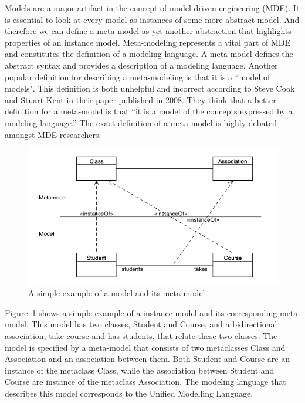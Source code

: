 Models are a major artifact in the concept of model driven engineering (MDE). It
is essential to look at every model as instances of some more abstract model.
And therefore we can define a meta-model as yet another abstraction that
highlights properties of an instance model. Meta-modeling represents a vital
part of MDE and constitutes the definition of a modeling language. A meta-model
defines the abstract syntax and provides a description of a modeling language.
Another popular definition for describing a meta-modeling is that it is a
``model of models". This definition is both unhelpful and incorrect according
to Steve Cook and Stuart Kent in their paper\cite{Cook2008} published in 2008.
They think that a better definition for a meta-model is that ``it is a model of
the concepts expressed by a modeling language.'' The exact definition of a
meta-model is highly debated amongst MDE researchers\cite{Rutle_thesis}. 

\begin{figure}[H]
	\centering
	\includegraphics[scale=0.6]{./Figures/SimpleMetamodel.png}
	\caption[Example of a model and meta-model]
	{A simple example of a model and its meta-model.}
	\label{fig:SimpleMeta-model}
\end{figure}

Figure~\ref{fig:SimpleMeta-model} shows a simple example of a instance model and
its corresponding meta-model. This model has two classes, Student and Course, and
a bidirectional association, take course and has students, that relate
these two classes. The model is specified by a meta-model that consists of two
metaclasses Class and Association and an association between them. Both Student
and Course are an instance of the metaclass Class, while the association
between Student and Course are instance of the metaclass Association. The
modeling language that describes this model corresponds to the Unified Modelling
Language.

